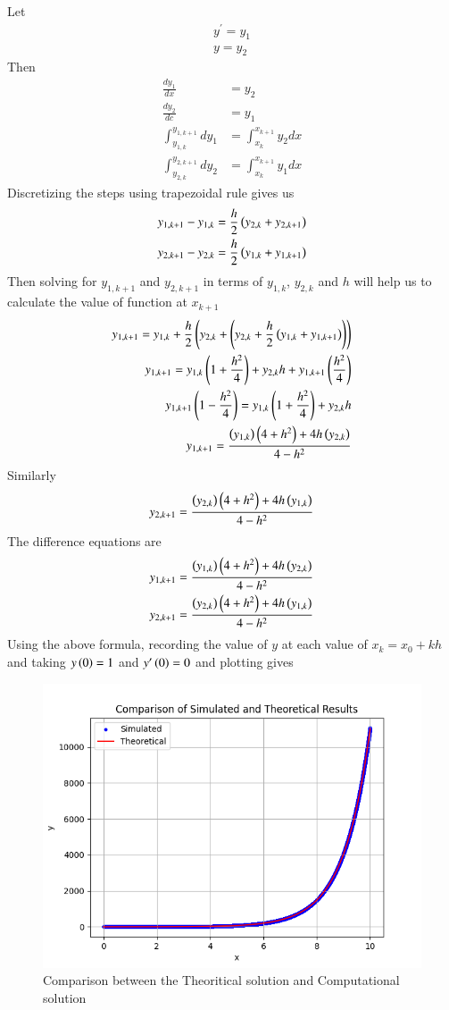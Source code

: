 \documentclass[journal]{IEEEtran}
\begin{document}
Let
\begin{align}
	y^\prime = y_1\\
	y = y_2
\end{align}
Then
\begin{align}
	\frac{dy_1}{dx} &= y_2\\
	\frac{dy_2}{dc} &= y_1\\
	\int_{y_{1,k}}^{y_{1,k+1}}dy_1 &= \int_{x_k}^{x_{k+1}}y_2dx\\
	\int_{y_{2,k}}^{y_{2,k+1}}dy_2 &= \int_{x_k}^{x_{k+1}}y_1dx
\end{align}
Discretizing the steps using trapezoidal rule gives us
\begin{align}
	y_{1,k+1} - y_{1,k} = \frac{h}{2}\left(y_{2,k}+y_{2,k+1}\right)\\
	y_{2,k+1} - y_{2,k} = \frac{h}{2}\left(y_{1,k}+y_{1,k+1}\right)
\end{align}
Then solving for $y_{1,k+1}$ and $y_{2,k+1}$ in terms of $y_{1,k}$, $y_{2,k}$ and $h$ will help us to calculate the value of function at $x_{k+1}$
\begin{align}
	y_{1,k+1} = y_{1,k} + \frac{h}{2}\left(y_{2,k}+\left(y_{2,k}+\frac{h}{2}\left(y_{1,k}+y_{1,k+1}\right)\right)\right)\\
	y_{1,k+1} = y_{1,k}\left(1+\frac{h^2}{4}\right) + y_{2,k}h + y_{1,k+1}\left(\frac{h^2}{4}\right)\\
	y_{1,k+1}\left(1-\frac{h^2}{4}\right) = y_{1,k}\left(1+\frac{h^2}{4}\right) + y_{2,k}h\\
	y_{1,k+1} = \frac{\left(y_{1,k}\right)\left(4+h^2\right)+4h\left(y_{2,k}\right)}{4-h^2}
\end{align}
Similarly
\begin{align}
y_{2,k+1} = \frac{\left(y_{2,k}\right)\left(4+h^2\right)+4h\left(y_{1,k}\right)}{4-h^2}
\end{align}
The difference equations are
\begin{align}
y_{1,k+1} = \frac{\left(y_{1,k}\right)\left(4+h^2\right)+4h\left(y_{2,k}\right)}{4-h^2}\\
y_{2,k+1} = \frac{\left(y_{2,k}\right)\left(4+h^2\right)+4h\left(y_{1,k}\right)}{4-h^2}
\end{align}
Using the above formula, recording the value of $y$ at each value of $x_{k} = x_0 + kh$ and taking $y\left(0\right) = 1$ and $y^\prime\left(0\right)=0$ and plotting gives
\begin{figure}[h!]
   \centering
   \includegraphics[width=\columnwidth]{figs/fig.png}
   \caption{Comparison between the Theoritical solution and Computational solution}
   \label{stemplot}
\end{figure}
\end{document}
